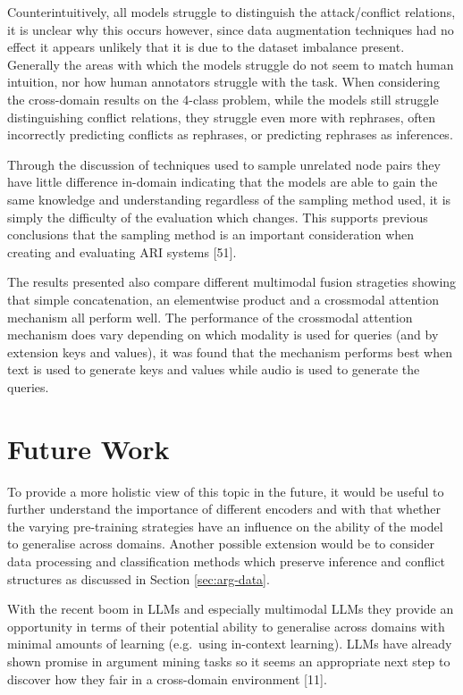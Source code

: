 \documentclass[twocolumn,twoside]{article}
\begin{document}
Counterintuitively, all models struggle to distinguish the
attack/conflict relations, it is unclear why this occurs however, since
data augmentation techniques had no effect it appears unlikely that it
is due to the dataset imbalance present. Generally the areas with which
the models struggle do not seem to match human intuition, nor how human
annotators struggle with the task. When considering the cross-domain
results on the 4-class problem, while the models still struggle
distinguishing conflict relations, they struggle even more with
rephrases, often incorrectly predicting conflicts as rephrases, or
predicting rephrases as inferences.

Through the discussion of techniques used to sample unrelated node pairs
they have little difference in-domain indicating that the models are
able to gain the same knowledge and understanding regardless of the
sampling method used, it is simply the difficulty of the evaluation
which changes. This supports previous conclusions that the sampling
method is an important consideration when creating and evaluating ARI
systems {[}51{]}.

The results presented also compare different multimodal fusion
strageties showing that simple concatenation, an elementwise product and
a crossmodal attention mechanism all perform well. The performance of
the crossmodal attention mechanism does vary depending on which modality
is used for queries (and by extension keys and values), it was found
that the mechanism performs best when text is used to generate keys and
values while audio is used to generate the queries.

\section{Future Work}\label{future-work}

To provide a more holistic view of this topic in the future, it would be
useful to further understand the importance of different encoders and
with that whether the varying pre-training strategies have an influence
on the ability of the model to generalise across domains. Another
possible extension would be to consider data processing and
classification methods which preserve inference and conflict structures
as discussed in Section \ref{sec:arg-data}.

With the recent boom in LLMs and especially multimodal LLMs they provide
an opportunity in terms of their potential ability to generalise across
domains with minimal amounts of learning (e.g.~using in-context
learning). LLMs have already shown promise in argument mining tasks so
it seems an appropriate next step to discover how they fair in a
cross-domain environment {[}11{]}.
\end{document}
